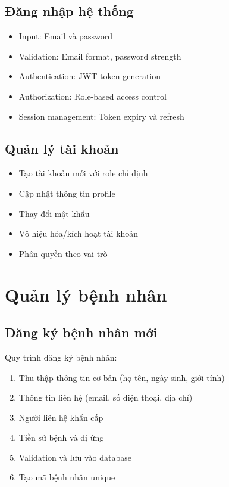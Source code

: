 \documentclass[12pt,a4paper]{report}
\begin{document}
\subsection{Đăng nhập hệ thống}
\begin{itemize}
    \item Input: Email và password
    \item Validation: Email format, password strength
    \item Authentication: JWT token generation
    \item Authorization: Role-based access control
    \item Session management: Token expiry và refresh
\end{itemize}

\subsection{Quản lý tài khoản}
\begin{itemize}
    \item Tạo tài khoản mới với role chỉ định
    \item Cập nhật thông tin profile
    \item Thay đổi mật khẩu
    \item Vô hiệu hóa/kích hoạt tài khoản
    \item Phân quyền theo vai trò
\end{itemize}

\section{Quản lý bệnh nhân}

\subsection{Đăng ký bệnh nhân mới}
Quy trình đăng ký bệnh nhân:
\begin{enumerate}
    \item Thu thập thông tin cơ bản (họ tên, ngày sinh, giới tính)
    \item Thông tin liên hệ (email, số điện thoại, địa chỉ)
    \item Người liên hệ khẩn cấp
    \item Tiền sử bệnh và dị ứng
    \item Validation và lưu vào database
    \item Tạo mã bệnh nhân unique
\end{enumerate}
\end{document}
